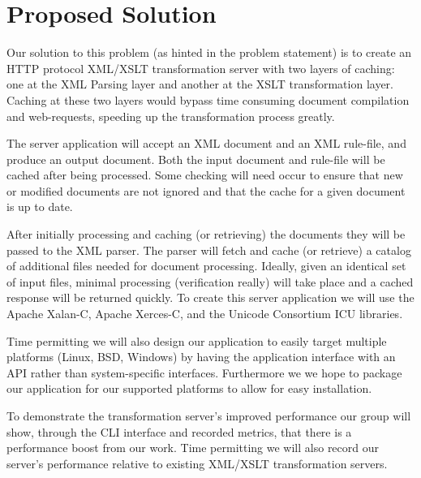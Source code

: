 % 
% 
\section*{Proposed Solution}

Our solution to this problem (as hinted in the problem statement) is to create an HTTP protocol XML/XSLT transformation server with two layers of caching: one at the XML Parsing layer and another at the XSLT transformation layer.
Caching at these two layers would bypass time consuming document compilation and web-requests, speeding up the transformation process greatly.

The server application will accept an XML document and an XML rule-file, and produce an output document.
Both the input document and rule-file will be cached after being processed.
Some checking will need occur to ensure that new or modified documents are not ignored and that the cache for a given document is up to date.

After initially processing and caching (or retrieving) the documents they will be passed to the XML parser.
The parser will fetch and cache (or retrieve) a catalog of additional files needed for document processing.
Ideally, given an identical set of input files, minimal processing (verification really) will take place and a cached response will be returned quickly.
To create this server application we will use the Apache Xalan-C, Apache Xerces-C, and the Unicode Consortium ICU libraries. \cite{xalan,xerces,icu}

Time permitting we will also design our application to easily target multiple platforms (Linux, BSD, Windows) by having the application interface with an API rather than system-specific interfaces.
Furthermore we we hope to package our application for our supported platforms to allow for easy installation.

To demonstrate the transformation server's improved performance our group will show, through the CLI interface and recorded metrics, that there is a performance boost from our work.
Time permitting we will also record our server's performance relative to existing XML/XSLT transformation servers.

